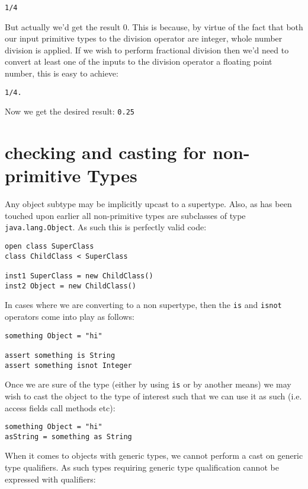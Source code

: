 \documentclass[conc-doc]{subfiles}
\begin{document}
\begin{lstlisting}
1/4
\end{lstlisting}

But actually we'd get the result 0. This is because, by virtue of the fact that both our input primitive types to the division operator are integer, whole number division is applied. If we wish to perform fractional division then we'd need to convert at least one of the inputs to the division operator a floating point number, this is easy to achieve:

\begin{lstlisting}
1/4.
\end{lstlisting}

Now we get the desired result: \lstinline{0.25}

\section{checking and casting for non-primitive Types}
Any object subtype may be implicitly upcast to a supertype. Also, as has been touched upon earlier all non-primitive types are subclasses of type \lstinline{java.lang.Object}. As such this is perfectly valid code:

\begin{lstlisting}
open class SuperClass
class ChildClass < SuperClass

inst1 SuperClass = new ChildClass()
inst2 Object = new ChildClass()
\end{lstlisting}

In cases where we are converting to a non supertype, then the \lstinline{is} and \lstinline{isnot} operators come into play as follows:

\begin{lstlisting}
something Object = "hi"

assert something is String
assert something isnot Integer
\end{lstlisting}

Once we are sure of the type (either by using \lstinline{is} or by another means) we may wish to cast the object to the type of interest such that we can use it as such (i.e. access fields call methods etc):

\begin{lstlisting}
something Object = "hi"
asString = something as String
\end{lstlisting}

When it comes to objects with generic types, we cannot perform a cast on generic type qualifiers. As such types requiring generic type qualification cannot be expressed with qualifiers:
\end{document}
